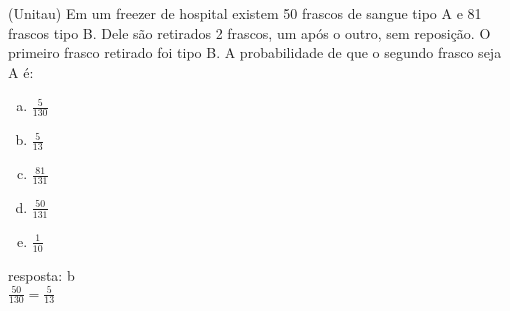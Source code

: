 \begin{ex}
 (Unitau) Em um freezer de hospital existem 50 frascos de sangue tipo A e 81 frascos tipo B. Dele são retirados 2 frascos, um após o outro, sem reposição. O primeiro frasco retirado foi tipo B. A probabilidade de que o segundo frasco seja A é:
    \begin{enumerate}[(a)]
    \item $\frac{5}{130}$
    \item $\frac{5}{13}$
    \item $\frac{81}{131}$
    \item $\frac{50}{131}$
    \item $\frac{1}{10}$
    \end{enumerate}
    \begin{sol}
    resposta: b \\
    $\frac{50}{130}=\frac{5}{13}$
    \end{sol}
\end{ex}